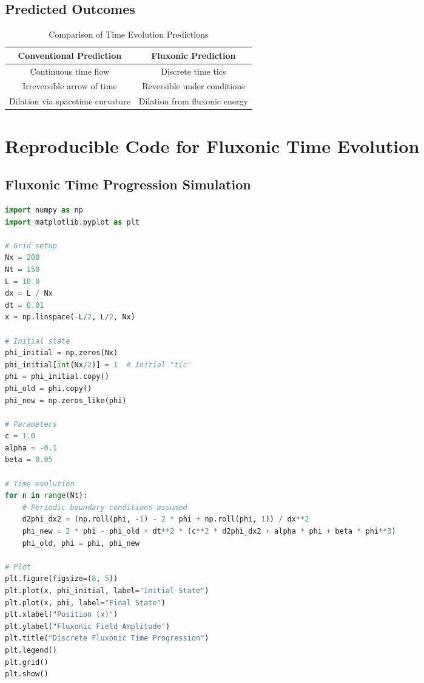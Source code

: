 \documentclass{article}
\begin{document}
\subsection{Predicted Outcomes}
\begin{table}[h]
    \centering
    \begin{tabular}{|c|c|}
        \hline
        \textbf{Conventional Prediction} & \textbf{Fluxonic Prediction} \\
        \hline
        Continuous time flow & Discrete time tics \\
        Irreversible arrow of time & Reversible under conditions \\
        Dilation via spacetime curvature & Dilation from fluxonic energy \\
        \hline
    \end{tabular}
    \caption{Comparison of Time Evolution Predictions}
    \label{tab:predictions}
\end{table}

\section{Reproducible Code for Fluxonic Time Evolution}
\subsection{Fluxonic Time Progression Simulation}
\begin{lstlisting}[language=Python, caption=Fluxonic Time Progression Simulation, label=lst:time]
import numpy as np
import matplotlib.pyplot as plt

# Grid setup
Nx = 200
Nt = 150
L = 10.0
dx = L / Nx
dt = 0.01
x = np.linspace(-L/2, L/2, Nx)

# Initial state
phi_initial = np.zeros(Nx)
phi_initial[int(Nx/2)] = 1  # Initial "tic"
phi = phi_initial.copy()
phi_old = phi.copy()
phi_new = np.zeros_like(phi)

# Parameters
c = 1.0
alpha = -0.1
beta = 0.05

# Time evolution
for n in range(Nt):
    # Periodic boundary conditions assumed
    d2phi_dx2 = (np.roll(phi, -1) - 2 * phi + np.roll(phi, 1)) / dx**2
    phi_new = 2 * phi - phi_old + dt**2 * (c**2 * d2phi_dx2 + alpha * phi + beta * phi**3)
    phi_old, phi = phi, phi_new

# Plot
plt.figure(figsize=(8, 5))
plt.plot(x, phi_initial, label="Initial State")
plt.plot(x, phi, label="Final State")
plt.xlabel("Position (x)")
plt.ylabel("Fluxonic Field Amplitude")
plt.title("Discrete Fluxonic Time Progression")
plt.legend()
plt.grid()
plt.show()
\end{lstlisting}
\end{document}
